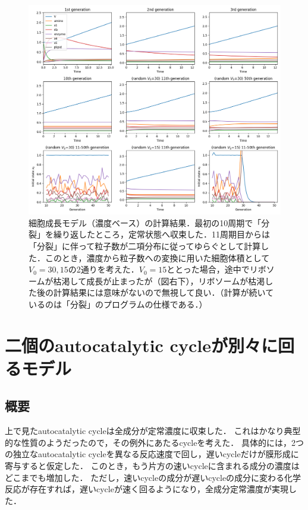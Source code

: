 \documentclass[a4paper,11pt]{jsarticle}
\begin{document}
\begin{figure}[htbp]
  \centering
  \includegraphics[width=\columnwidth]{cell2.png}
  \caption{細胞成長モデル（濃度ベース）の計算結果．最初の10周期で「分裂」を繰り返したところ，定常状態へ収束した．11周期目からは「分裂」に伴って粒子数が二項分布に従ってゆらぐとして計算した．このとき，濃度から粒子数への変換に用いた細胞体積として$V_0 = 30,15$の2通りを考えた．$V_0=15$ととった場合，途中でリボソームが枯渇して成長が止まったが（図右下），リボソームが枯渇した後の計算結果には意味がないので無視して良い．（計算が続いているのは「分裂」のプログラムの仕様である．）}
  \label{fig:cell2}
\end{figure}


\section{二個のautocatalytic cycleが別々に回るモデル}
\subsection{概要}
上で見たautocatalytic cycleは全成分が定常濃度に収束した．
これはかなり典型的な性質のようだったので，その例外にあたるcycleを考えた．
具体的には，2つの独立なautocatalytic cycleを異なる反応速度で回し，遅いcycleだけが膜形成に寄与すると仮定した．
このとき，もう片方の速いcycleに含まれる成分の濃度はどこまでも増加した．
ただし，速いcycleの成分が遅いcycleの成分に変わる化学反応が存在すれば，遅いcycleが速く回るようになり，全成分定常濃度が実現した．
\end{document}
